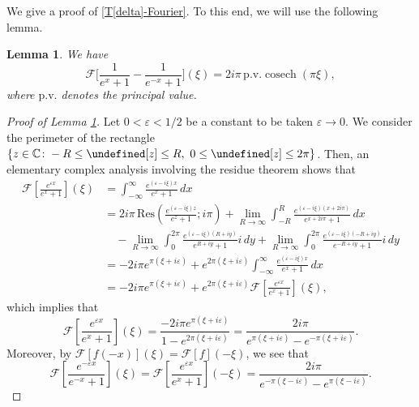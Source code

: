 \documentclass{amsart}
\newtheorem{lemma}[proposition]{Lemma}
\numberwithin{equation}{section}
\newcommand{\pv}{\textrm{p.v.}}
\let\Re=\undefined\DeclareMathOperator{\Re}{Re}
\let\Im=\undefined\DeclareMathOperator{\Im}{Im}
\begin{document}
We give a proof of \eqref{T[delta]-Fourier}. 
To this end, we will use the following lemma. 
\begin{lemma}\label{25/7/19/11:17}
We have
\begin{equation}\label{25/7/19/11:18}
\mathcal{F}\bigg[ \frac{1}{e^{x}+1} -\frac{1}{e^{-x}+1}\bigg](\xi) = 2i \pi \,\pv\operatorname{cosech}{(\pi \xi)} ,
\end{equation}
where $\pv$ denotes the principal value.
\end{lemma}
\begin{proof}[Proof of Lemma \ref{25/7/19/11:17}]
Let $0<\varepsilon <1/2$ be a constant to be taken $\varepsilon \to 0$.  
We consider the perimeter of the rectangle $\{ z \in \mathbb{C} \colon -R \leq \Re[z] \leq R,~0\leq \Im[z]\leq 2\pi \}$. Then, an elementary complex analysis involving the residue theorem shows that 
\[ \begin{aligned} 
\mathcal{F}\left[\frac{e^{\varepsilon x}}{e^{x}+1}\right](\xi)
&= \int_{-\infty}^{\infty} \frac{e^{(\varepsilon -i\xi) x}}{e^{x}+1} \,dx \\
&=2 i \pi\,\mathrm{Res} \left(\frac{e^{(\varepsilon -i\xi)z}}{e^{z}+1}; i\pi \right)+\lim_{R\to \infty}\int_{-R}^{R} \frac{e^{(\varepsilon -i\xi) (x+2 i \pi )}}{e^{x+2i \pi}+1} \,dx \\
&\quad -\lim_{R\to \infty}\int_{0}^{2\pi} \frac{e^{(\varepsilon -i\xi) (R+iy)}}{e^{R+iy}+1} i \,dy+\lim_{R\to \infty}\int_{0}^{2\pi} \frac{e^{(\varepsilon -i\xi) (-R+iy)}}{e^{-R+iy}+1} i\,dy\\
&=-2i \pi e^{\pi(\xi + i\varepsilon)}+e^{2\pi(\xi + i\varepsilon)}\int_{-\infty}^{\infty} \frac{e^{(\varepsilon -i\xi) x}}{e^{x}+1} \,dx \\
&=-2i \pi e^{\pi(\xi + i\varepsilon)}+ e^{2\pi(\xi + i\varepsilon)}\mathcal{F}\left[ \frac{e^{\varepsilon x}}{e^{x}+1}\right](\xi),
\end{aligned} \]
which implies that  
\begin{equation}\label{25/7/19/10:53}
\mathcal{F}\left[\frac{e^{\varepsilon x}}{e^{x}+1}\right](\xi)=\frac{-2i \pi e^{\pi(\xi + i\varepsilon)}}{1-e^{2\pi(\xi + i\varepsilon)}}=\frac{2i \pi }{e^{\pi(\xi + i\varepsilon)}-e^{-\pi(\xi + i\varepsilon)}}.
\end{equation}
Moreover, by $\mathcal{F}[f(-x)](\xi) = \mathcal{F}[f](-\xi)$, we see that 
\begin{equation}\label{25/7/19/10:7}
\mathcal{F}\left[\frac{e^{-\varepsilon x}}{e^{-x}+1}\right](\xi)=
\mathcal{F}\left[\frac{e^{\varepsilon x}}{e^{x}+1}\right](-\xi)=
\frac{2i \pi }{e^{-\pi(\xi - i\varepsilon)}-e^{\pi(\xi - i\varepsilon)}}.

\end{equation}
\end{proof}
\end{document}

